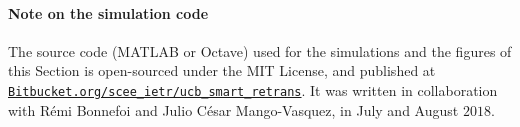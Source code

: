 \paragraph{Note on the simulation code}
%
The source code (MATLAB or Octave) used for the simulations and the figures of this Section is open-sourced under the MIT License, and published at \href{https://Bitbucket.org/scee_ietr/ucb_smart_retrans}{\texttt{Bitbucket.org/scee\_ietr/ucb\_smart\_retrans}}.
It was written in collaboration with Rémi Bonnefoi and Julio César Mango-Vasquez, in July and August $2018$.
